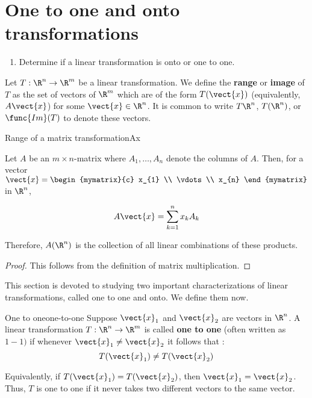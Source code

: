 \section{One to one and onto transformations}

\begin{outcome}
  \begin{enumerate}
  \item Determine if a linear transformation is onto or one to one.
  \end{enumerate}
\end{outcome}

Let $T: \R^n \to \R^m$ be a linear transformation. We define the \textbf{range} or \textbf{image} of $T$ as the set of vectors of $\R^{m}$ which are of the form
$T (\vect{x})$ (equivalently, $A\vect{x}$) for some $\vect{x}\in \R^{n}$. It is common
to write $T\R^{n}$, $T(\R^{n})$, or
$\func{Im}(T) $ to denote these vectors.

\begin{lemma}{Range of a matrix transformation}{Ax}

Let $A$ be an $m\times n$-matrix where $A_{1},\ldots, A_{n}$ denote the columns of
$A$. Then, for a vector $\vect{x}=\begin{mymatrix}{c}
x_{1} \\
\vdots \\
 x_{n}
\end{mymatrix}$ in $\R^n$,

\begin{equation*}
A\vect{x}=\sum_{k=1}^{n}x_{k}A_{k}
\end{equation*}

Therefore, $A (\R^n)$ is the collection of all
linear combinations of these products.
\end{lemma}

\begin{proof}
This follows from the definition of matrix multiplication.
\end{proof}

This section is devoted to studying two important characterizations of linear transformations, called one to one and onto. We define them now.

\begin{definition}{One to one}{one-to-one}
Suppose $\vect{x}_1$ and $\vect{x}_2$ are vectors in $\R^n$. A linear transformation $T: \R^n \to \R^m$ is called \textbf{one to one} (often written as $1-1)$ if whenever
 $\vect{x}_1 \neq \vect{x}_2$ it follows that :
\begin{equation*}
T(\vect{x}_1) \neq T (\vect{x}_2)
\end{equation*}

Equivalently, if $T(\vect{x}_1) =T(\vect{x}_2)$,
then $\vect{x}_1 = \vect{x}_2$. Thus,  $T$ is one to one if it never takes two different
vectors to the same vector.
\end{definition}


